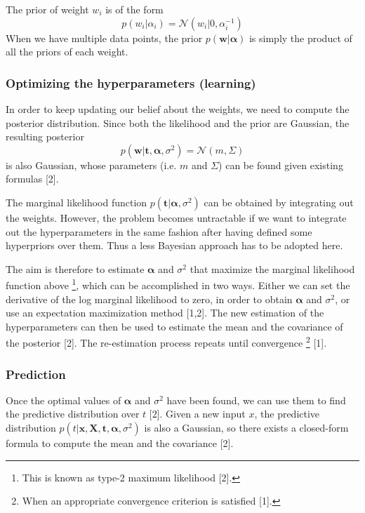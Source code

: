 The prior of weight $w_i$ is of the form
\begin{equation}
p(w_i|\alpha_i)=\mathcal{N}(w_i|0,\alpha_{i}^{-1})
\end{equation}
When we have multiple data points, the prior $p(\boldsymbol{w}|\boldsymbol{\alpha})$ is simply the product of all the priors of each weight.

\subsubsection{Optimizing the hyperparameters (learning)} In order to keep updating our belief about the weights, we need to compute the posterior distribution. Since both the likelihood and the prior are Gaussian, the resulting posterior
\begin{equation}
p(\boldsymbol{w}|\boldsymbol{t}, \boldsymbol{\alpha}, \sigma^2)=\mathcal{N}(m,\Sigma)
\end{equation}
is also Gaussian, whose parameters (i.e. $m$ and $\Sigma$) can be found given existing formulas [2].

The marginal likelihood function $p(\boldsymbol{t}| \boldsymbol{\alpha}, \sigma^2)$ can be obtained by integrating out the weights. However, the problem becomes untractable if we want to integrate out the hyperparameters in the same fashion after having defined some hyperpriors over them. Thus a less Bayesian approach has to be adopted here.

The aim is therefore to estimate $\boldsymbol{\alpha}$ and $\sigma^2$ that maximize the marginal likelihood function above \footnote{This is known as type-2 maximum likelihood [2].}, which can be accomplished in two ways. Either we can set the derivative of the log marginal likelihood to zero, in order to obtain $\boldsymbol{\alpha}$ and $\sigma^2$, or use an expectation maximization method [1,2]. The new estimation of the hyperparameters can then be used to estimate the mean and the covariance of the posterior [2]. The re-estimation process repeats until convergence \footnote{When an appropriate convergence criterion is satisfied [1]. } [1].

\subsubsection{Prediction}
Once the optimal values of $\boldsymbol{\alpha}$ and $\sigma^2$ have been found, we can use them to find the predictive distribution over $t$ [2]. Given a new input $x$, the predictive distribution $p(t|\boldsymbol{x}, \boldsymbol{X}, \boldsymbol{t}, \boldsymbol{\alpha}, \sigma^2)$ is also a Gaussian, so there exists a closed-form formula to compute the mean and the covariance [2].

